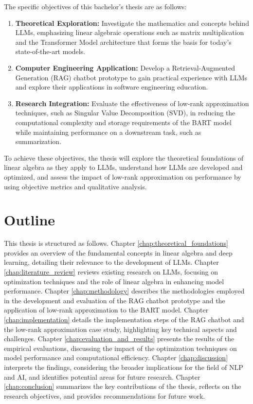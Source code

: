 The specific objectives of this bachelor's thesis are as follows:
\begin{enumerate}
    \item \textbf{Theoretical Exploration:} Investigate the mathematics and concepts behind LLMs, emphasizing linear algebraic operations such as matrix multiplication and the Transformer Model architecture that forms the basis for today's state-of-the-art models.
    \item \textbf{Computer Engineering Application:} Develop a Retrieval-Augmented Generation (RAG) chatbot prototype to gain practical experience with LLMs and explore their applications in software engineering education.
    \item \textbf{Research Integration:} Evaluate the effectiveness of low-rank approximation techniques, such as Singular Value Decomposition (SVD), in reducing the computational complexity and storage requirements of the BART model while maintaining performance on a downstream task, such as summarization.
\end{enumerate}

To achieve these objectives, the thesis will explore the theoretical foundations of linear algebra as they apply to LLMs, understand how LLMs are developed and optimized, and assess the impact of low-rank approximation on performance by using objective metrics and qualitative analysis.

\section{Outline}
This thesis is structured as follows. 
Chapter \ref{chap:theoretical_foundations} provides an overview of the fundamental concepts in linear algebra and deep learning, detailing their relevance to the development of LLMs. 
Chapter \ref{chap:literature_review} reviews existing research on LLMs, focusing on optimization techniques and the role of linear algebra in enhancing model performance. 
Chapter \ref{chap:methodology} describes the methodologies employed in the development and evaluation of the RAG chatbot prototype and the application of low-rank approximation to the BART model. 
Chapter \ref{chap:implementation} details the implementation steps of the RAG chatbot and the low-rank approximation case study, highlighting key technical aspects and challenges. 
Chapter \ref{chap:evaluation_and_results} presents the results of the empirical evaluations, discussing the impact of the optimization techniques on model performance and computational efficiency. 
Chapter \ref{chap:discussion} interprets the findings, considering the broader implications for the field of NLP and AI, and identifies potential areas for future research. 
Chapter \ref{chap:conclusion} summarizes the key contributions of the thesis, reflects on the research objectives, and provides recommendations for future work.